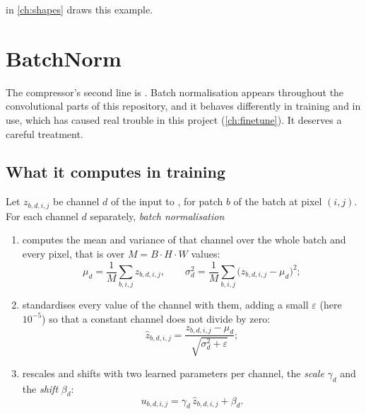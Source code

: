  in \cref{ch:shapes} draws this example.

\section{BatchNorm}\label{sec:compressor:bn}

The compressor's second line is . Batch normalisation \citep{ioffe2015batch}
appears throughout the convolutional parts of this repository, and it behaves differently in training
and in use, which has caused real trouble in this project (\cref{ch:finetune}). It deserves a careful
treatment.

\subsection{What it computes in training}

\begin{definition}
Let $z_{b,d,i,j}$ be channel $d$ of the input to , for patch $b$ of the batch at pixel
$(i,j)$. For each channel $d$ separately, \emph{batch normalisation}
\begin{enumerate}
\item computes the mean and variance of that channel over the whole batch and every pixel, that is over
  $M = B\cdot H\cdot W$ values:
  \begin{equation}\label{eq:compressor:bnstats}
  \mu_d = \frac{1}{M}\sum_{b,i,j} z_{b,d,i,j},\qquad
  \sigma_d^2 = \frac{1}{M}\sum_{b,i,j} \bigl(z_{b,d,i,j} - \mu_d\bigr)^2;
  \end{equation}
\item standardises every value of the channel with them, adding a small $\varepsilon$ (here $10^{-5}$)
  so that a constant channel does not divide by zero:
  \begin{equation}\label{eq:compressor:bnstd}
  \hat{z}_{b,d,i,j} = \frac{z_{b,d,i,j} - \mu_d}{\sqrt{\sigma_d^2 + \varepsilon}};
  \end{equation}
\item rescales and shifts with two learned parameters per channel, the \emph{scale}
  $\gamma_d$ and the \emph{shift} $\beta_d$:
  \begin{equation}\label{eq:compressor:bnaffine}
  u_{b,d,i,j} = \gamma_d\,\hat{z}_{b,d,i,j} + \beta_d .
  \end{equation}
\end{enumerate}
\end{definition}

